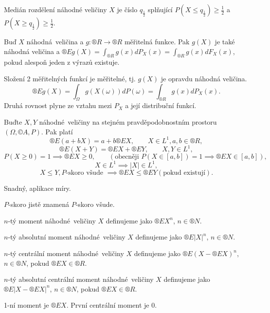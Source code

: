 \documentclass[12pt]{article}					%
\begin{document}
\begin{definice}[Medián]
	Medián rozdělení náhodné veličiny $X$ je číslo $q_{\frac{1}{2}}$ splňující $P(X ≤ q_{\frac{1}{2}}) ≥ \frac{1}{2}$ a $P(X ≥ q_{\frac{1}{2}}) ≥ \frac{1}{2}$.
\end{definice}


\begin{veta}
	Buď $X$ náhodná veličina a $g: ®R \rightarrow ®R$ měřitelná funkce. Pak $g(X)$ je také náhodná veličina a $®E g(X) = \int_{®R} g(x) d P_X(x) = \int_{®R} g(x) dF_X(x)$, pokud alespoň jeden z výrazů existuje.

	\begin{dukazin}
		Složení 2 měřitelných funkcí je měřitelné, tj. $g(X)$ je opravdu náhodná veličina.
		$$ ®E g(X) = \int_{\Omega} g(X(\omega)) d P(\omega) = \int_{®R} g(x) d P_X(x). $$
		Druhá rovnost plyne ze vztahu mezi $P_X$ a její distribuční funkcí.
	\end{dukazin}
\end{veta}

\begin{veta}
	Buďte $X, Y$ náhodné veličiny na stejném pravděpodobnostním prostoru $(\Omega, ©A, P)$. Pak platí
	$$ ®E(a + bX) = a + b ®E X,\qquad X \in L^1, a, b \in ®R, $$
	$$ ®E(X + Y) = ®E X + ®E Y, \qquad X, Y \in L^1, $$
	$$ P(X ≥ 0)  = 1 \implies ®E X ≥ 0, \qquad (\text{obecněji } P(X \in [a, b]) = 1 \implies ®E X \in [a, b]), $$
	$$ X \in L^1 \implies |X| \in L^1, $$
	$$ X ≤ Y, P\text{-skoro všude } \implies ®E X ≤ ®E Y (\text{pokud existují}). $$

	\begin{dukazin}
		Snadný, aplikace míry.
	\end{dukazin}
\end{veta}

\begin{definice}
	$P$-skoro jistě znamená $P$-skoro všude.
\end{definice}

\begin{definice}[$n-tý$ moment]
	$n$-tý moment náhodné veličiny $X$ definujeme jako $®E X^n$, $n \in ®N$.

	$n$-tý absolutní moment náhodné veličiny $X$ definujeme jako $®E |X|^n$, $n \in ®N$.
	
	$n$-tý centrální moment náhodné veličiny $X$ definujeme jako $®E (X - ®E X)^n$, $n \in ®N$, pokud $®E X \in ®R$.
	
	$n$-tý absolutní centrální moment náhodné veličiny $X$ definujeme jako $®E |X - ®E X|^n$, $n \in ®N$, pokud $®E X \in ®R$.

	\begin{poznamkain}
		1-ní moment je $®E X$. První centrální moment je 0.
	\end{poznamkain}
\end{definice}
\end{document}
